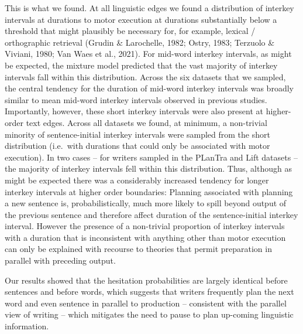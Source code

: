 \documentclass[
  man,floatsintext]{apa7}
\begin{document}
This is what we found. At all linguistic edges we found a distribution of interkey intervals at durations to motor execution at durations substantially below a threshold that might plausibly be necessary for, for example, lexical / orthographic retrieval (Grudin \& Larochelle, 1982; Ostry, 1983; Terzuolo \& Viviani, 1980; Van Waes et al., 2021). For mid-word interkey intervals, as might be expected, the mixture model predicted that the vast majority of interkey intervals fall within this distribution. Across the six datasets that we sampled, the central tendency for the duration of mid-word interkey intervals was broadly similar to mean mid-word interkey intervals observed in previous studies. Importantly, however, these short interkey intervals were also present at higher-order text edges. Across all datasets we found, at minimum, a non-trivial minority of sentence-initial interkey intervals were sampled from the short distribution (i.e.~with durations that could only be associated with motor execution). In two cases -- for writers sampled in the PLanTra and Lift datasets -- the majority of interkey intervals fell within this distribution. Thus, although as might be expected there was a considerably increased tendency for longer interkey intervals at higher order boundaries: Planning associated with planning a new sentence is, probabilistically, much more likely to spill beyond output of the previous sentence and therefore affect duration of the sentence-initial interkey interval. However the presence of a non-trivial proportion of interkey intervals with a duration that is inconsistent with anything other than motor execution can only be explained with recourse to theories that permit preparation in parallel with preceding output.

Our results showed that the hesitation probabilities are largely identical before sentences and before words, which suggests that writers frequently plan the next word and even sentence in parallel to production -- consistent with the parallel view of writing -- which mitigates the need to pause to plan up-coming linguistic information.
\end{document}
